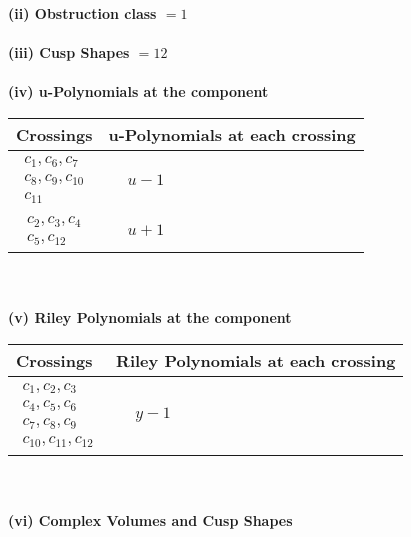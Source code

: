 \documentclass[1p]{elsarticle_modified}
\theoremstyle{definition}
\begin{document}
\flushleft \textbf{(ii) Obstruction class $= 1$}\\~\\
\flushleft \textbf{(iii) Cusp Shapes $= 12$}\\~\\
\newpage\renewcommand{\arraystretch}{1}
\flushleft \textbf{(iv) u-Polynomials at the component}\newline \\
\begin{tabular}{m{50pt}|m{274pt}}
Crossings & \hspace{64pt}u-Polynomials at each crossing \\
\hline $$\begin{aligned}c_{1},c_{6},c_{7}\\c_{8},c_{9},c_{10}\\c_{11}\end{aligned}$$&$\begin{aligned}
&u-1
\end{aligned}$\\
\hline $$\begin{aligned}c_{2},c_{3},c_{4}\\c_{5},c_{12}\end{aligned}$$&$\begin{aligned}
&u+1
\end{aligned}$\\
\hline
\end{tabular}\\~\\
\newpage\renewcommand{\arraystretch}{1}
\flushleft \textbf{(v) Riley Polynomials at the component}\newline \\
\begin{tabular}{m{50pt}|m{274pt}}
Crossings & \hspace{64pt}Riley Polynomials at each crossing \\
\hline $$\begin{aligned}c_{1},c_{2},c_{3}\\c_{4},c_{5},c_{6}\\c_{7},c_{8},c_{9}\\c_{10},c_{11},c_{12}\end{aligned}$$&$\begin{aligned}
&y-1
\end{aligned}$\\
\hline
\end{tabular}\\~\\
\newpage\flushleft \textbf{(vi) Complex Volumes and Cusp Shapes}
\end{document}
